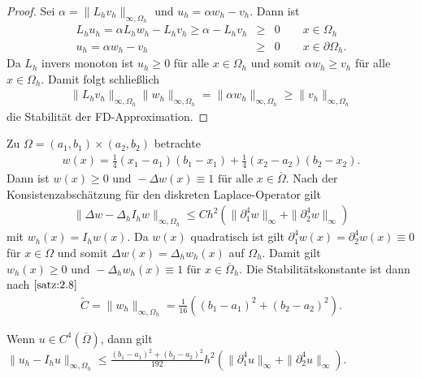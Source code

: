 \begin{proof}
    Sei $\alpha = \|L_h v_h\|_{\infty, \Omega_h}$ und $u_h = \alpha w_h -
    v_h$. Dann ist
    \begin{eqnarray*}
        L_h u_h = \alpha L_h w_h - L_h v_h \ge \alpha - L_h v_h &\ge& 0
        \qquad x \in \Omega_h \\
        u_h = \alpha w_h - v_h &\ge& 0 \qquad x \in \partial \Omega_h.
    \end{eqnarray*}
    Da $L_h$ invers monoton ist $u_h \ge 0$ für alle $x\in \Omega_h$ und somit
    $\alpha w_h \ge v_h$ für alle $x\in \Omega_h$. Damit folgt schlie\ss{}lich
    \begin{eqnarray*}
        \|L_h v_h\|_{\infty, \Omega_h} \|w_h\|_{\infty, \Omega_h} =
        \|\alpha w_h\|_{\infty, \Omega_h} \ge \|v_h\|_{\infty, \Omega_h}
    \end{eqnarray*}
    die Stabilität der FD-Approximation.
\end{proof}


\begin{Beispiel}
    Zu $\Omega = (a_1, b_1) \times (a_2, b_2)$ betrachte
    \begin{eqnarray*}
     	  w(x)
        = \frac{1}{4} (x_1 - a_1) (b_1 - x_1) + \frac{1}{4} (x_2 - a_2)
          (b_2 - x_2).
    \end{eqnarray*}
    Dann ist $w(x) \ge 0 \text{ und } -\Delta w(x) \equiv 1 \text{ für alle }
    x\in \overline\Omega$. Nach der Konsistenzabschätzung für den diskreten
    Laplace-Operator gilt
    \begin{eqnarray*}
        \|\Delta w - \Delta_h I_h w\|_{\infty, \Omega_h} \le C h^2
        \left(\|\partial_1^4 w\|_\infty + \|\partial_2^4 w\|_\infty\right)
    \end{eqnarray*}
    mit $w_h(x) = I_h w(x)$. Da $w(x)$ quadratisch ist gilt $\partial_1^4 w(x)
    = \partial_2^4 w(x) \equiv 0$ für $x\in \Omega$ und somit $\Delta w(x) =
    \Delta_h w_h(x)$ auf $\Omega_h$. Damit gilt $w_h(x) \ge 0 \text{ und }
    -\Delta_h w_h(x) \equiv 1 \text{ für } x\in \overline\Omega_h$.
    Die Stabilitätskonstante ist dann nach $\eqref{satz:2.8}$
    \begin{eqnarray*}
        \tilde C = \|w_h\|_{\infty, \Omega_h} =
        \frac{1}{16} \left((b_1 - a_1)^2 + (b_2 - a_2)^2\right).
    \end{eqnarray*}
\end{Beispiel}


\begin{Bemerkung}
    Wenn $u \in C^4(\overline\Omega)$, dann gilt
    $\|u_h - I_h u\|_{\infty, \Omega_h}
    \le \frac{(b_1 - a_1)^2 + (b_2 - a_2)^2}{192} h^2
    \left(\|\partial_1^4 u\|_\infty + \|\partial_2^4 u\|_\infty\right)$.
\end{Bemerkung}


